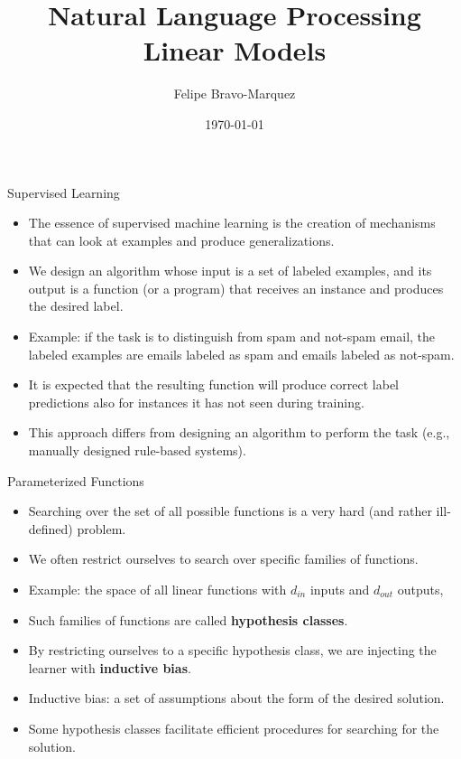 \documentclass[handout]{beamer}
\title{Natural Language Processing \\ Linear Models}
\author[Felipe Bravo Márquez]{\footnotesize
 \textcolor[rgb]{0.00,0.00,1.00}{Felipe Bravo-Marquez}}
\date{\today}
\begin{document}
\begin{frame}
\titlepage


\end{frame}



\begin{frame}{Supervised Learning}
\begin{scriptsize}
\begin{itemize}
\item The essence of supervised machine learning is the creation of mechanisms that can look at examples and produce generalizations. \cite{goldberg2017neural}
\item We design an algorithm whose input is a set of labeled examples, and
its output is a function (or a program) that receives an instance and produces the desired label.
\item Example: if the task is to distinguish from spam and not-spam email, the labeled examples are emails labeled as spam and emails labeled as not-spam.
\item It is expected that the resulting function will produce correct label
predictions also for instances it has not seen during training.
\item This approach differs from designing an algorithm to perform the task (e.g., manually designed rule-based systems).
\end{itemize}


\end{scriptsize}
\end{frame}


\begin{frame}{Parameterized Functions}
\begin{scriptsize}
\begin{itemize}
\item Searching over the set of all possible functions is a very hard (and rather ill-defined) problem. \cite{goldberg2017neural}
\item We often restrict ourselves to search over specific families of functions.
\item Example: the space of all linear functions with $d_{in}$ inputs and $d_{out}$ outputs, 
\item Such families of functions are called \textbf{hypothesis classes}. 
\item By restricting ourselves to a specific hypothesis class, we are injecting the learner with \textbf{inductive bias}.
\item Inductive bias: a set of assumptions about the form of the desired solution.
\item Some hypothesis classes facilitate efficient procedures for searching for the solution. \cite{goldberg2017neural}
\end{itemize}


\end{scriptsize}
\end{frame}
\end{document}
